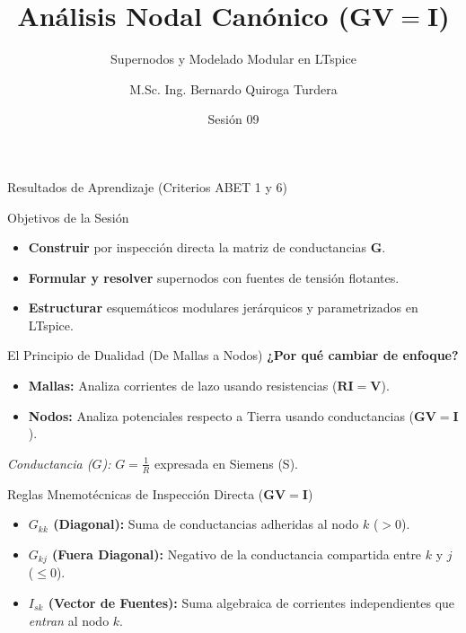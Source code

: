 \documentclass[aspectratio=169, 10pt]{beamer}
\title[Análisis Nodal Canónico]{Análisis Nodal Canónico ($\mathbf{G}\mathbf{V}=\mathbf{I}$)}
\subtitle{Supernodos y Modelado Modular en LTspice}
\author[M.Sc. Ing. B. Quiroga]{M.Sc. Ing. Bernardo Quiroga Turdera}
\institute[UCB Tarija]{IMT-121 Circuitos Electrónicos I | Semestre II/2026}
\date{Sesión 09}
\begin{document}
\begin{frame}
    \titlepage
\end{frame}

\begin{frame}{Resultados de Aprendizaje (Criterios ABET 1 y 6)}
    \begin{block}{Objetivos de la Sesión}
        \begin{itemize}
            \item \textbf{Construir} por inspección directa la matriz de conductancias $\mathbf{G}$.
            \item \textbf{Formular y resolver} supernodos con fuentes de tensión flotantes.
            \item \textbf{Estructurar} esquemáticos modulares jerárquicos y parametrizados en LTspice.
        \end{itemize}
    \end{block}
\end{frame}

\begin{frame}{El Principio de Dualidad (De Mallas a Nodos)}
    \textbf{¿Por qué cambiar de enfoque?}
    \begin{itemize}
        \item \textbf{Mallas:} Analiza corrientes de lazo usando resistencias ($\mathbf{R}\mathbf{I}=\mathbf{V}$).
        \item \textbf{Nodos:} Analiza potenciales respecto a Tierra usando conductancias ($\mathbf{G}\mathbf{V}=\mathbf{I}$).
    \end{itemize}
    \textit{Conductancia ($G$):} $G = \frac{1}{R}$ expresada en Siemens (\unit{\siemens}).

    \vspace{0.4cm}
    \begin{alertblock}{Reglas Mnemotécnicas de Inspección Directa ($\mathbf{G}\mathbf{V}=\mathbf{I}$)}
        \begin{itemize}
            \item \textbf{$G_{kk}$ (Diagonal):} Suma de conductancias adheridas al nodo $k$ ($>0$).
            \item \textbf{$G_{kj}$ (Fuera Diagonal):} Negativo de la conductancia compartida entre $k$ y $j$ ($\le 0$).
            \item \textbf{$I_{sk}$ (Vector de Fuentes):} Suma algebraica de corrientes independientes que \textit{entran} al nodo $k$.
        \end{itemize}
    \end{alertblock}
\end{frame}
\end{document}
